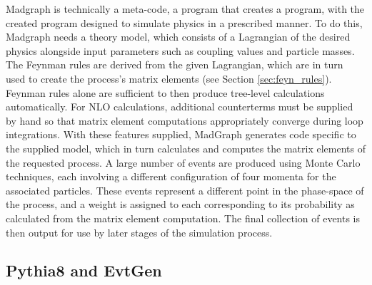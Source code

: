     Madgraph is technically a meta-code, a program that creates a program,
        with the created program designed to simulate physics in a prescribed manner.
    To do this, Madgraph needs a theory model, which consists of a Lagrangian of the desired physics
        alongside input parameters such as coupling values and particle masses.
    The Feynman rules are derived from the given Lagrangian,
        which are in turn used to create the process's matrix elements (see Section \ref{sec:feyn_rules}).
    Feynman rules alone are sufficient to then produce tree-level calculations automatically.
    For NLO calculations, additional counterterms must be supplied by hand
        so that matrix element computations appropriately converge during loop integrations. 
    With these features supplied, MadGraph generates code specific to the supplied model,
        which in turn calculates and computes the matrix elements of the requested process.
    A large number of events are produced using Monte Carlo techniques,
        each involving a different configuration of four momenta for the associated particles.
    These events represent a different point in the phase-space of the process,
        and a weight is assigned to each corresponding to its probability as calculated from the matrix element computation.
    The final collection of events is then output for use by later stages of the simulation process.

    \subsection{Pythia8 and EvtGen}\label{sec:pythia}

